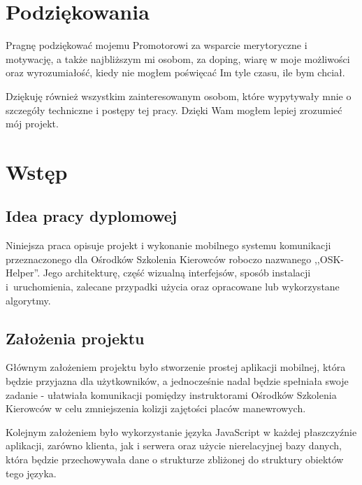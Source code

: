 \documentclass[twoside,a4paper,openright,12pt]{book}
\begin{document}
\frontmatter

\chapter*{Podziękowania}

Pragnę podziękować mojemu Promotorowi za wsparcie merytoryczne i motywację, a także najbliższym mi osobom, za doping, wiarę w moje możliwości oraz wyrozumiałość, kiedy nie mogłem poświęcać Im tyle czasu, ile bym chciał.

Dziękuję również wszystkim zainteresowanym osobom, które wypytywały mnie o szczegóły techniczne i postępy tej pracy. Dzięki Wam mogłem lepiej zrozumieć mój projekt.

\tableofcontents





\mainmatter

\chapter{Wstęp}
\section{Idea pracy dyplomowej}

Niniejsza praca opisuje projekt i wykonanie mobilnego systemu komunikacji przeznaczonego dla Ośrodków Szkolenia Kierowców roboczo nazwanego ,,OSK-Helper''. Jego architekturę, część wizualną interfejsów, sposób instalacji i~uruchomienia, zalecane przypadki użycia oraz opracowane lub wykorzystane algorytmy.


\section{Założenia projektu}

Głównym założeniem projektu było stworzenie prostej aplikacji mobilnej, która będzie przyjazna dla użytkowników, a jednocześnie nadal będzie spełniała swoje zadanie - ułatwiała komunikacji pomiędzy instruktorami Ośrodków Szkolenia Kierowców w celu zmniejszenia kolizji zajętości placów manewrowych.

Kolejnym założeniem było wykorzystanie języka JavaScript w każdej płaszczyźnie aplikacji, zarówno klienta, jak i serwera oraz użycie nierelacyjnej bazy danych, która będzie przechowywała dane o strukturze zbliżonej do struktury obiektów tego języka.
\end{document}
